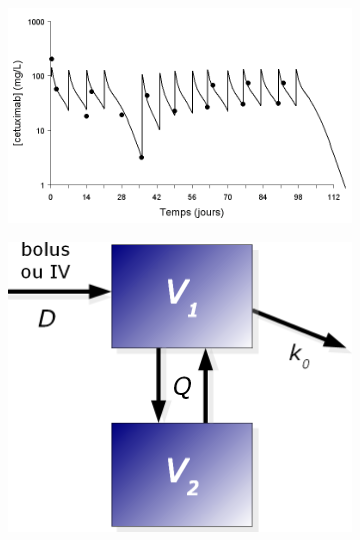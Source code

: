 \begin{figure}[htbp]
  
  \begin{subfigure}[b]{0.75\linewidth}
    \centering
    \includegraphics[width=0.75\linewidth]{figures/raster/FIG_19c1} 
  \end{subfigure}%
  \begin{subfigure}[b]{0.25\linewidth}
    \centering
    \includegraphics[width=0.75\linewidth]{figures/raster/FIG_19c2} 
  \end{subfigure} 
  

\end{figure}
